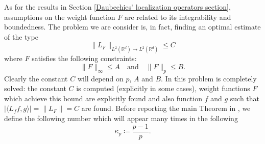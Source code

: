 \documentclass[corpo=11pt, stile=classica, tipotesi=custom,
greek, evenboxes, english]{toptesi}
\numberwithin{equation}{chapter}
\newcommand{\R}{\mathbb{R}} %
\begin{document}
As for the results in Section \ref{Daubechies' localization operators section}, assumptions on the weight function $F$ are related to its integrability and boundedness. The problem we are consider is, in fact, finding an optimal estimate of the type
\begin{equation}\label{sharp estimate Nicola-Tilli}
	\|L_F\|_{L^2(\R^d) \rightarrow L^2(\R^d)} \leq C
\end{equation}
where $F$ satisfies the following constraints:
\begin{equation}\label{constraints Nicola-Tilli}
	\|F\|_{\infty} \leq A \quad \text{and} \quad \|F\|_p \leq B.
\end{equation}
Clearly the constant $C$ will depend on $p$, $A$ and $B$. In \cite{nicolatilli_norm} this problem is completely solved: the constant $C$ is computed (explicitly in some cases), weight functions $F$ which achieve this bound are explicitly found and also function $f$ and $g$ such that $|\langle L_f f, g \rangle| = \|L_F\| = C$ are found. Before reporting the main Theorem in \cite{nicolatilli_norm}, we define the following number which will appear many times in the following
\begin{equation}\label{kappa_p}
	\kappa_p \coloneqq \dfrac{p-1}{p}.
\end{equation}
\end{document}
